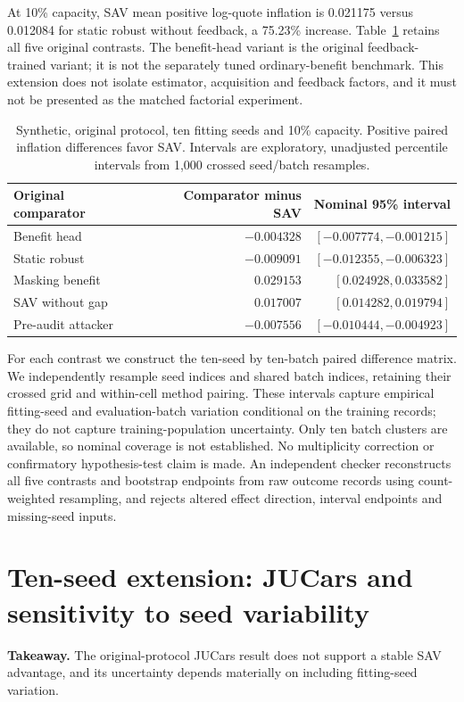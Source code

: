 \documentclass[11pt]{article}
\begin{document}
At 10\% capacity, SAV mean positive log-quote inflation is 0.021175 versus
0.012084 for static robust without feedback, a 75.23\% increase. Table~\ref{tab:tenseed}
retains all five original contrasts. The benefit-head variant is the original
feedback-trained variant; it is not the separately tuned ordinary-benefit
benchmark. This extension does not isolate estimator, acquisition and feedback
factors, and it must not be presented as the matched factorial experiment.

\begin{table}[htbp]
\centering\small
\begin{tabular}{lrr}
\toprule
Original comparator & Comparator minus SAV & Nominal 95\% interval\\
\midrule
Benefit head & $-0.004328$ & $[-0.007774,-0.001215]$\\
Static robust & $-0.009091$ & $[-0.012355,-0.006323]$\\
Masking benefit & $0.029153$ & $[0.024928,0.033582]$\\
SAV without gap & $0.017007$ & $[0.014282,0.019794]$\\
Pre-audit attacker & $-0.007556$ & $[-0.010444,-0.004923]$\\
\bottomrule
\end{tabular}
\caption{Synthetic, original protocol, ten fitting seeds and 10\% capacity.
Positive paired inflation differences favor SAV. Intervals are exploratory,
unadjusted percentile intervals from 1,000 crossed seed/batch resamples.}
\label{tab:tenseed}
\end{table}

For each contrast we construct the ten-seed by ten-batch paired difference
matrix. We independently resample seed indices and shared batch indices,
retaining their crossed grid and within-cell method pairing. These intervals
capture empirical fitting-seed and evaluation-batch variation conditional on
the training records; they do not capture training-population uncertainty.
Only ten batch clusters are available, so nominal coverage is not established.
No multiplicity correction or confirmatory hypothesis-test claim is made.
An independent checker reconstructs all five contrasts and bootstrap endpoints
from raw outcome records using count-weighted resampling, and rejects altered
effect direction, interval endpoints and missing-seed inputs.


\section{Ten-seed extension: JUCars and sensitivity to seed variability}
\noindent\textbf{Takeaway.} The original-protocol JUCars result does not support
a stable SAV advantage, and its uncertainty depends materially on including
fitting-seed variation.
\end{document}
